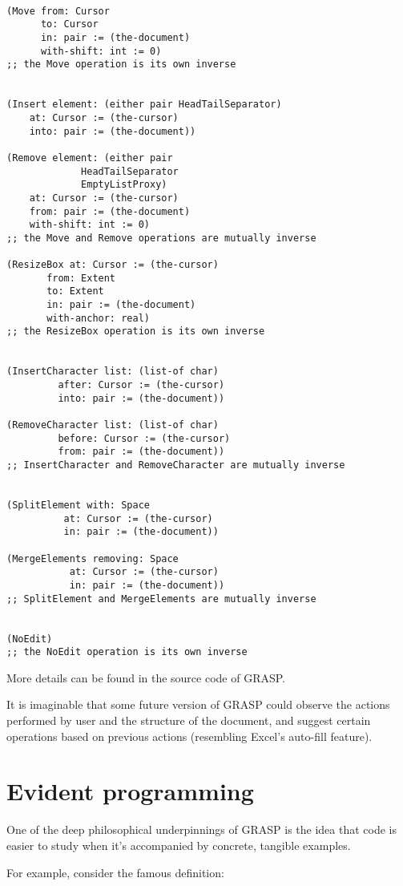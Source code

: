 \documentclass[11pt]{article}
\begin{document}
\begin{verbatim}

(Move from: Cursor
      to: Cursor
      in: pair := (the-document)
      with-shift: int := 0)
;; the Move operation is its own inverse


(Insert element: (either pair HeadTailSeparator)
	at: Cursor := (the-cursor)
	into: pair := (the-document))

(Remove element: (either pair
			 HeadTailSeparator
			 EmptyListProxy)
	at: Cursor := (the-cursor)
	from: pair := (the-document)
	with-shift: int := 0)
;; the Move and Remove operations are mutually inverse

(ResizeBox at: Cursor := (the-cursor)
	   from: Extent
	   to: Extent
	   in: pair := (the-document)
	   with-anchor: real)
;; the ResizeBox operation is its own inverse


(InsertCharacter list: (list-of char)
		 after: Cursor := (the-cursor)
		 into: pair := (the-document))

(RemoveCharacter list: (list-of char)
		 before: Cursor := (the-cursor)
		 from: pair := (the-document))
;; InsertCharacter and RemoveCharacter are mutually inverse


(SplitElement with: Space
	      at: Cursor := (the-cursor)
	      in: pair := (the-document))

(MergeElements removing: Space
	       at: Cursor := (the-cursor)
	       in: pair := (the-document))
;; SplitElement and MergeElements are mutually inverse


(NoEdit)
;; the NoEdit operation is its own inverse

\end{verbatim}

More details can be found in the source code
of GRASP.

It is imaginable that some future version
of GRASP could observe the actions performed
by user and the structure of the document,
and suggest certain operations based on
previous actions (resembling Excel's auto-fill
feature).

\section{Evident programming}
\label{sec:org2f74645}

One of the deep philosophical underpinnings
of GRASP is the idea that code is easier to study
when it's accompanied by concrete, tangible examples.

For example, consider the famous definition:
\end{document}

